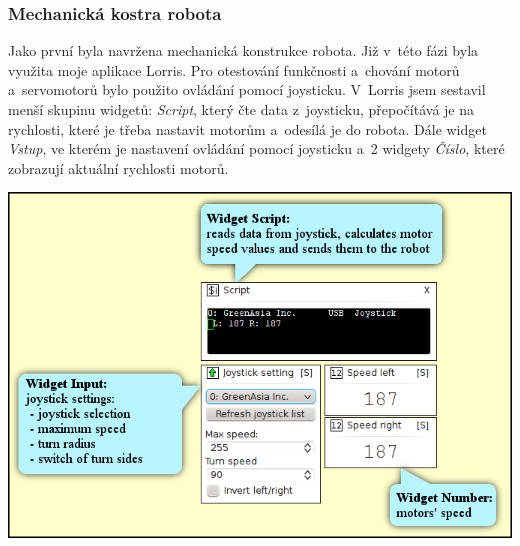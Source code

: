 \documentclass[12pt, a4paper, oneside]{article}
\newcommand{\It}{\textit}  %
\begin{document}
\subsubsection{Mechanická kostra robota}
Jako první byla navržena mechanická konstrukce robota. Již v~této fázi byla využita moje aplikace Lorris. Pro otestování funkčnosti a~chování motorů a~servomotorů bylo použito ovládání pomocí joysticku. V~Lorris jsem sestavil menší skupinu widgetů: \It{Script}, který čte data z~joysticku, přepočítává je na rychlosti, které je třeba nastavit motorům a~odesílá je do robota. Dále widget \It{Vstup}, ve kterém je nastavení ovládání pomocí joysticku a~2 widgety \It{Číslo}, které zobrazují aktuální rychlosti motorů.
\vspace{30mm}
\begin{center}
\includegraphics[width=\textwidth]{img/joystick_david.png}
\end{center}

\newpage
\end{document}

